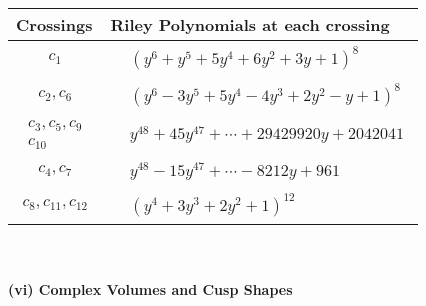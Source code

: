 \documentclass[1p]{elsarticle_modified}
\theoremstyle{definition}
\begin{document}
\begin{tabular}{m{50pt}|m{274pt}}
Crossings & \hspace{64pt}Riley Polynomials at each crossing \\
\hline $$\begin{aligned}c_{1}\end{aligned}$$&$\begin{aligned}
&(y^6+y^5+5 y^4+6 y^2+3 y+1)^8
\end{aligned}$\\
\hline $$\begin{aligned}c_{2},c_{6}\end{aligned}$$&$\begin{aligned}
&(y^6-3 y^5+5 y^4-4 y^3+2 y^2- y+1)^8
\end{aligned}$\\
\hline $$\begin{aligned}c_{3},c_{5},c_{9}\\c_{10}\end{aligned}$$&$\begin{aligned}
&y^{48}+45 y^{47}+\cdots+29429920 y+2042041
\end{aligned}$\\
\hline $$\begin{aligned}c_{4},c_{7}\end{aligned}$$&$\begin{aligned}
&y^{48}-15 y^{47}+\cdots-8212 y+961
\end{aligned}$\\
\hline $$\begin{aligned}c_{8},c_{11},c_{12}\end{aligned}$$&$\begin{aligned}
&(y^4+3 y^3+2 y^2+1)^{12}
\end{aligned}$\\
\hline
\end{tabular}\\~\\
\newpage\flushleft \textbf{(vi) Complex Volumes and Cusp Shapes}
\end{document}
